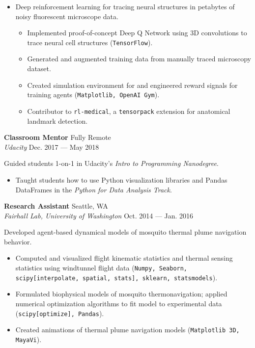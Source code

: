 \documentclass[a4paper,12pt]{article}
\newcommand{\ressubheading}[4]{{\begin{minipage}{\textwidth}
                                    \textbf{#1} \hfill #2 \\
                                    \textit{#3} \hfill #4 \\
\end{minipage}}}
\begin{document}
    \begin{itemize}
        \item Deep reinforcement learning for tracing neural structures in petabytes of noisy fluorescent microscope data.

        \begin{itemize}
            \item Implemented proof-of-concept Deep Q Network using 3D convolutions to trace neural cell structures (\texttt{TensorFlow}).
            \item Generated and augmented training data from manually traced microscopy dataset.
            \item Created simulation environment for and engineered reward signals for training agents (\texttt{Matplotlib, OpenAI Gym}).
            \item Contributor to \texttt{rl-medical}, a \texttt{tensorpack} extension for anatomical landmark detection.
        \end{itemize}

    \end{itemize}

    \ressubheading{Classroom Mentor}{Fully Remote}{Udacity}{Dec. 2017 --- May 2018}

    Guided students 1-on-1 in Udacity's \textit{Intro to Programming Nanodegree}.
    \begin{itemize}
        \item Taught students how to use Python visualization libraries and Pandas DataFrames in the \textit{Python for Data Analysis Track}.
    \end{itemize}


    \ressubheading{Research Assistant}{Seattle, WA}{Fairhall Lab, University of Washington}{Oct. 2014 --- Jan. 2016}

    \vspace{-6pt} Developed agent-based dynamical models of mosquito thermal plume navigation behavior.

    \begin{itemize}
        \item Computed and visualized flight kinematic statistics and thermal sensing statistics using windtunnel flight data (\texttt{Numpy, Seaborn, scipy[interpolate, spatial, stats], sklearn, statsmodels}).
        \item Formulated biophysical models of mosquito thermonavigation;
        applied numerical optimization algorithms to fit model to experimental data (\texttt{scipy[optimize], Pandas}).
        \item Created animations of thermal plume navigation models (\texttt{Matplotlib 3D, MayaVi}).
    \end{itemize}
\end{document}
